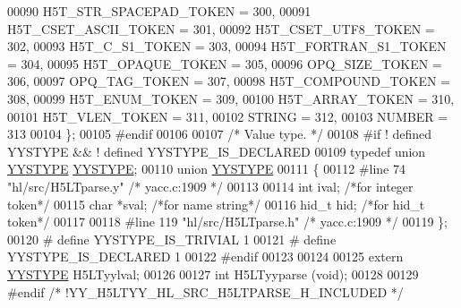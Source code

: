 \begin{DoxyCode}
00090     H5T\_STR\_SPACEPAD\_TOKEN = 300,
00091     H5T\_CSET\_ASCII\_TOKEN = 301,
00092     H5T\_CSET\_UTF8\_TOKEN = 302,
00093     H5T\_C\_S1\_TOKEN = 303,
00094     H5T\_FORTRAN\_S1\_TOKEN = 304,
00095     H5T\_OPAQUE\_TOKEN = 305,
00096     OPQ\_SIZE\_TOKEN = 306,
00097     OPQ\_TAG\_TOKEN = 307,
00098     H5T\_COMPOUND\_TOKEN = 308,
00099     H5T\_ENUM\_TOKEN = 309,
00100     H5T\_ARRAY\_TOKEN = 310,
00101     H5T\_VLEN\_TOKEN = 311,
00102     STRING = 312,
00103     NUMBER = 313
00104   \};
00105 \textcolor{preprocessor}{#endif}
00106 
00107 \textcolor{comment}{/* Value type.  */}
00108 \textcolor{preprocessor}{#if ! defined YYSTYPE && ! defined YYSTYPE\_IS\_DECLARED}
00109 \textcolor{keyword}{typedef} \textcolor{keyword}{union }\hyperlink{union_y_y_s_t_y_p_e}{YYSTYPE} \hyperlink{union_y_y_s_t_y_p_e}{YYSTYPE};
00110 \textcolor{keyword}{union }\hyperlink{union_y_y_s_t_y_p_e}{YYSTYPE}
00111 \{
00112 \textcolor{preprocessor}{#line 74 "hl/src/H5LTparse.y" }\textcolor{comment}{/* yacc.c:1909  */}\textcolor{preprocessor}{}
00113 
00114     \textcolor{keywordtype}{int}     ival;         \textcolor{comment}{/*for integer token*/}
00115     \textcolor{keywordtype}{char}    *sval;        \textcolor{comment}{/*for name string*/}
00116     hid\_t   hid;          \textcolor{comment}{/*for hid\_t token*/}
00117 
00118 \textcolor{preprocessor}{#line 119 "hl/src/H5LTparse.h" }\textcolor{comment}{/* yacc.c:1909  */}\textcolor{preprocessor}{}
00119 \};
00120 \textcolor{preprocessor}{# define YYSTYPE\_IS\_TRIVIAL 1}
00121 \textcolor{preprocessor}{# define YYSTYPE\_IS\_DECLARED 1}
00122 \textcolor{preprocessor}{#endif}
00123 
00124 
00125 \textcolor{keyword}{extern} \hyperlink{union_y_y_s_t_y_p_e}{YYSTYPE} H5LTyylval;
00126 
00127 \textcolor{keywordtype}{int} H5LTyyparse (\textcolor{keywordtype}{void});
00128 
00129 \textcolor{preprocessor}{#endif }\textcolor{comment}{/* !YY\_H5LTYY\_HL\_SRC\_H5LTPARSE\_H\_INCLUDED  */}\textcolor{preprocessor}{}
\end{DoxyCode}

